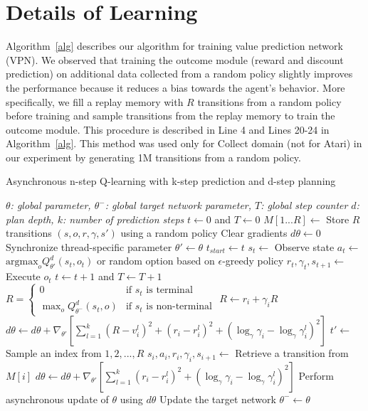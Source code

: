 \documentclass{article}
\begin{document}
\clearpage
\section{Details of Learning}
Algorithm~\ref{alg} describes our algorithm for training value prediction network (VPN). We observed that training the outcome module (reward and discount prediction) on additional data collected from a random policy slightly improves the performance because it reduces a bias towards the agent's behavior. 
More specifically, we fill a replay memory with $R$ transitions from a random policy before training and sample transitions from the replay memory to train the outcome module. This procedure is described in Line 4 and Lines 20-24 in Algorithm~\ref{alg}. This method was used only for Collect domain (not for Atari) in our experiment by generating 1M transitions from a random policy.
\begin{algorithm}[H]
\small
\caption{Asynchronous n-step Q-learning with k-step prediction and d-step planning}\label{alg}
\begin{algorithmic}[1]
\State \textit{$\theta$: global parameter, $\theta^-$: global target network parameter, $T$: global step counter}
\State \textit{$d$: plan depth, $k$: number of prediction steps}
\State $t \gets 0$ and $T \gets 0$
\State $M[1...R] \gets $ Store $R$ transitions $(s,o,r,\gamma,s')$ using a random policy
\State Clear gradients $d\theta \gets 0$
\State Synchronize thread-specific parameter $\theta' \gets \theta$
\State $t_{start} \gets t$
\State $s_t \gets$ Observe state 
\State $a_t \gets$ $\mbox{argmax}_o Q^{d}_{\theta'}(s_t,o_t)$ or random option based on $\epsilon$-greedy policy
\State $r_{t},\gamma_{t},s_{t+1} \gets$ Execute $o_t$
\State $t \gets t + 1$ and $T \gets T + 1$
\EndWhile
\State $R=\begin{cases}
0 & \mbox{if } s_t \mbox{ is terminal}\\
\max_o Q^{d}_{\theta^-}(s_t,o) & \mbox{if } s_t \mbox{ is non-terminal}
\end{cases}$
\State $R \gets r_i + \gamma_i R$
\State $d\theta \gets d\theta + \nabla_{\theta'}\left[\sum_{l=1}^{k}\left(R-v^{l}_i\right)^2 + \left(r_i-r^{l}_i\right)^2 + \left(\log_\gamma \gamma_i- \log_\gamma\gamma^{l}_i\right)^2 \right]$
\EndFor
\State $t' \gets$ Sample an index from $1, 2, ..., R$ 
\State $s_i,a_i,r_i,\gamma_i,s_{i+1} \gets$ Retrieve a transition from $M[i]$
\State $d\theta \gets d\theta + \nabla_{\theta'}\left[\sum_{l=1}^{k} \left(r_i-r^{l}_i\right)^2 + \left(\log_\gamma \gamma_i- \log_\gamma\gamma^{l}_i\right)^2 \right]$
\EndFor
\State Perform asynchronous update of $\theta$ using $d\theta$
\State Update the target network $\theta^- \gets \theta$
\EndIf
\EndWhile
\end{algorithmic}
\end{algorithm}
\end{document}

